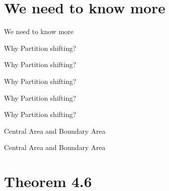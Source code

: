 \documentclass{beamer}
\begin{document}
\section{We need to know more}

\begin{frame}{We need to know more}



\end{frame}

\begin{frame}{Why Partition shifting?}



\end{frame}

\begin{frame}{Why Partition shifting?}



\end{frame}

\begin{frame}{Why Partition shifting?}



\end{frame}



\begin{frame}{Why Partition shifting?}



\end{frame}

\begin{frame}{Why Partition shifting?}



\end{frame}

\begin{frame}{Central Area and Boundary Area}



\end{frame}

\begin{frame}{Central Area and Boundary Area}



\end{frame}

\section{Theorem 4.6}
\end{document}
